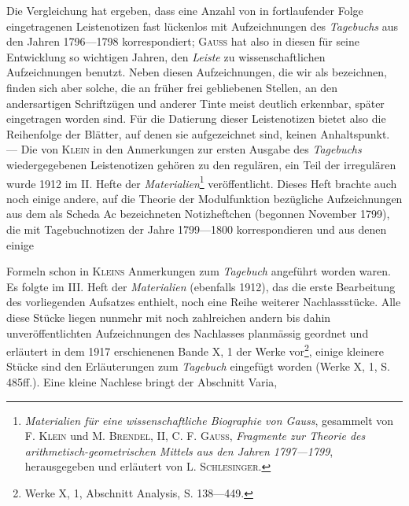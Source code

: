Die Vergleichung hat ergeben, dass eine Anzahl von in fortlaufender
Folge eingetragenen Leistenotizen fast lückenlos mit Aufzeichnungen des \textit{Tagebuchs}
aus den Jahren 1796—1798 korrespondiert; \textsc{Gauss} hat also in diesen
für seine Entwicklung so wichtigen Jahren, den \textit{Leiste}  zu
wissenschaftlichen Aufzeichnungen benutzt. Neben diesen Aufzeichnungen,
die wir als  bezeichnen, finden sich aber solche, die an früher frei
gebliebenen Stellen, an den andersartigen Schriftzügen und anderer Tinte meist
deutlich erkennbar, später eingetragen worden sind. Für die Datierung dieser
 Leistenotizen bietet also die Reihenfolge der Blätter, auf denen
sie aufgezeichnet sind, keinen Anhaltspunkt. — Die von \textsc{Klein} in den Anmerkungen
zur ersten Ausgabe des \textit{Tagebuchs} wiedergegebenen Leistenotizen
gehören zu den regulären, ein Teil der irregulären wurde 1912 im II. Hefte
der \textit{Materialien}\footnote{\textit{Materialien für eine wissenschaftliche Biographie von Gauss}, gesammelt von F. \textsc{Klein} und M. \textsc{Brendel}, II, C. F. \textsc{Gauss}, \textit{Fragmente zur Theorie des arithmetisch-geometrischen Mittels aus den Jahren 1797—1799}, herausgegeben und erläutert von L. \textsc{Schlesinger}.} veröffentlicht. Dieses Heft brachte auch noch einige andere,
auf die Theorie der Modulfunktion bezügliche Aufzeichnungen aus dem als
Scheda Ac bezeichneten Notizheftchen (begonnen November 1799), die mit
Tagebuchnotizen der Jahre 1799—1800 korrespondieren und aus denen einige\par
\clearpage{}
\noindent Formeln schon in \textsc{Kleins} Anmerkungen zum \textit{Tagebuch} angeführt worden
waren. Es folgte im III. Heft der \textit{Materialien} (ebenfalls 1912), das die erste
Bearbeitung des vorliegenden Aufsatzes enthielt, noch eine Reihe weiterer
Nachlassstücke. Alle diese Stücke liegen nunmehr mit noch zahlreichen andern
bis dahin unveröffentlichten Aufzeichnungen des Nachlasses planmässig
geordnet und erläutert in dem 1917 erschienenen Bande X, 1 der Werke vor\footnote{Werke X, 1, Abschnitt Analysis, S. 138—449.},
einige kleinere Stücke sind den Erläuterungen zum \textit{Tagebuch} eingefügt worden
(Werke X, 1, S. 485ff.). Eine kleine Nachlese bringt der Abschnitt Varia,
